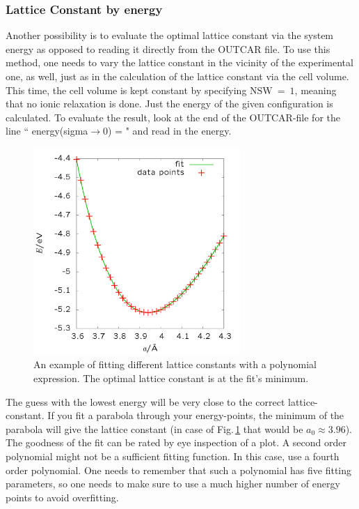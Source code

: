 \documentclass[twoside, 11pt, titlepage, captions=nooneline, a4paper, headsepline]{scrbook}%
\newcommand{\9}{\mathrm}
\newcommand{\0}{\,\mathrm}
\begin{document}
\subsubsection*{Lattice Constant by energy}
Another possibility is to evaluate the optimal lattice constant via the system energy as opposed to reading it directly from the OUTCAR file. To use this method, one needs to vary the lattice constant in the vicinity of the experimental one, as well, just as in the calculation of the lattice constant via the cell volume. This time, the cell volume is kept constant by specifying $ \mathrm{NSW}~=~1 $, meaning that no ionic relaxation is done. Just the energy of the given configuration is calculated. To evaluate the result, look at the end of the OUTCAR-file for the line `` energy(sigma$\rightarrow$0) = " and read in the energy.
\begin{figure}[h!!]
\centering
\includegraphics[width=0.7\textwidth]{Figures/BspFit.png}
\caption{An example of fitting different lattice constants with a polynomial expression. The optimal lattice constant is at the fit's minimum.}
\label{latfit}
\end{figure}
The guess with the lowest energy will be very close to the correct lattice-constant. If you fit a parabola through your energy-points, the minimum of the parabola will give the lattice constant (in case of Fig.\,\ref{latfit} that would be $a_0\approx3.96$). The goodness of the fit can be rated by eye inspection of a plot. A second order polynomial might not be a sufficient fitting function. In this case, use a fourth order polynomial. One needs to remember that such a polynomial has five fitting parameters, so one needs to make sure to use a much higher number of energy points to avoid overfitting. \\
\end{document}
